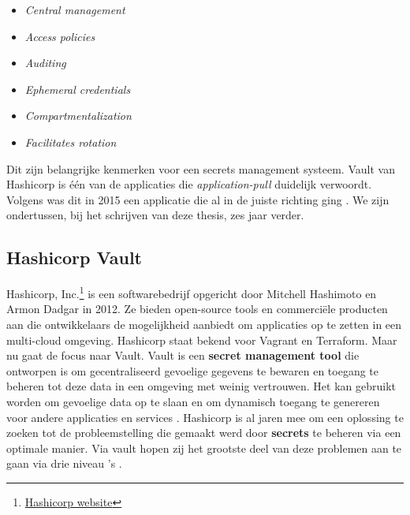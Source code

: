 \begin{itemize}
    \item \textit{Central management}
    \item \textit{Access policies}
    \item \textit{Auditing}
    \item \textit{Ephemeral credentials}
    \item \textit{Compartmentalization}
    \item \textit{Facilitates rotation}
\end{itemize}

Dit zijn belangrijke kenmerken voor een secrets management systeem. Vault van Hashicorp is één van de applicaties die \textit{application-pull} duidelijk verwoordt. Volgens \textcite{Somerfield2015} was dit in 2015 een applicatie die al in de juiste richting ging \autocite{Somerfield2015}. We zijn ondertussen, bij het schrijven van deze thesis, zes jaar verder.  
\newpage

\subsection{Hashicorp Vault}
\label{sec:Hashicorp vault}

Hashicorp, Inc.\footnote{\href{www.hashicorp.com}{Hashicorp website}} is een softwarebedrijf opgericht door Mitchell Hashimoto en Armon Dadgar in 2012. Ze bieden open-source tools en commerciële producten aan die ontwikkelaars de mogelijkheid aanbiedt om applicaties op te zetten in een multi-cloud omgeving. Hashicorp staat bekend voor Vagrant en Terraform. Maar nu gaat de focus naar Vault. Vault is een \textbf{secret management tool} die ontworpen is om gecentraliseerd gevoelige gegevens te bewaren en toegang te beheren tot deze data in een omgeving met weinig vertrouwen. Het kan gebruikt worden om gevoelige data op te slaan en om dynamisch toegang te genereren voor andere applicaties en services \autocite{Lugger2020}. Hashicorp is al jaren mee om een oplossing te zoeken tot de probleemstelling die gemaakt werd door \textbf{secrets} te beheren via een optimale manier. Via vault hopen zij het grootste deel van deze problemen aan te gaan via drie niveau 's \autocite{Dadgar2018}.

